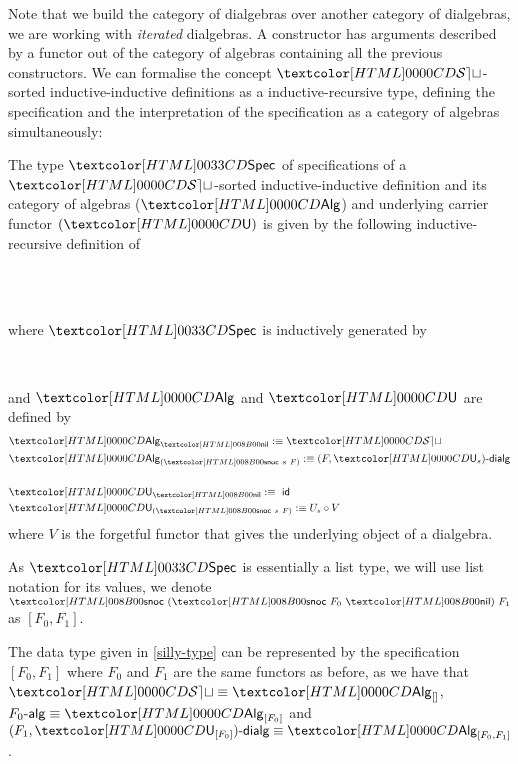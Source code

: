Note that we build the category of dialgebras over another category of
dialgebras, \ie we are working with \emph{iterated} dialgebras. A
constructor has arguments described by a functor out of the category
of algebras containing all the previous constructors. We can formalise
the concept $\SET$-sorted inductive-inductive definitions as a
inductive-recursive type, defining the specification and the
interpretation of the specification as a category of algebras
simultaneously:
%
\begin{definition}
  \label{type-sorted-spec}
  The type $\specty$ of specifications of a $\SET$-sorted
  inductive-inductive definition and its category of algebras ($\Alg$)
  and underlying carrier functor $(\Und)$ is given by the following
  inductive-recursive definition of
  \begin{sorts}
    \sortnamety{\specty}{\Set} \\
    \functy{\Alg}{\specty \to \Cat} \\
  \end{sorts}
  where $\specty$ is inductively generated by
  \begin{datatype}{\specty}{}
    \constr{\specnil}{\specty} \\
  \end{datatype}
  and $\Alg$ and $\Und$ are defined by
  \begin{align*}
    &\Alg_{\specnil} \ddefeq \SET \\
    &\Alg_{(\specsnoc\ s\ F)} \ddefeq \dialgcat{F}{\Und_s} \\
    \\
    &\Und_{\specnil} \ddefeq\ \id \\
    &\Und_{(\specsnoc\ s\ F)} \ddefeq U_s \circ V
  \end{align*}
  where $V$ is the forgetful functor that gives the underlying object of
  a dialgebra.
\end{definition}

As $\specty$ is essentially a list type, we will use list notation for
its values, \eg we denote $\specsnoc\ (\specsnoc\ F_0\ \specnil)\ F_1$
as $[F_0,F_1]$.

\begin{example}
  The data type given in \cref{silly-type} can be represented by the
  specification $[F_0, F_1]$ where $F_0$ and $F_1$ are the same
  functors as before, as we have that $\SET \defeq \Alg_{[]}$,
  $\algcat{F_0} \defeq \Alg_{[F_0]}$ and
  $\dialgcat{F_1}{\Und_{[F_0]}} \defeq \Alg_{[F_0,F_1]}$.
\end{example}


